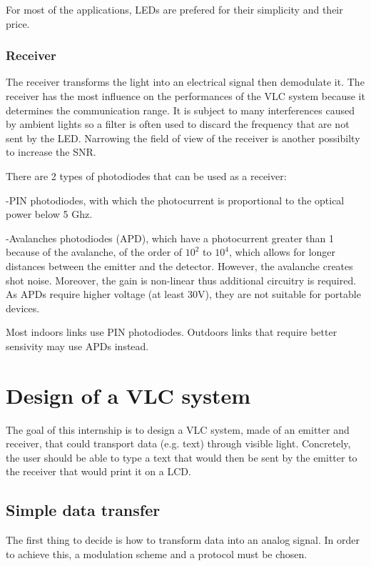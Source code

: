 \documentclass[12pt]{report}
\begin{document}
For most of the applications, LEDs are prefered for their simplicity and their price.

\subsection{Receiver}

The receiver transforms the light into an electrical signal then demodulate it. The receiver has the most influence on the performances of the VLC system because it determines the communication range. It is subject to many interferences caused by ambient lights so a filter is often used to discard the frequency that are not sent by the LED. Narrowing the field of view of the receiver is another possibilty to increase the SNR.

There are 2 types of photodiodes that can be used as a receiver:

-PIN photodiodes, with which the photocurrent is proportional to the optical power below 5 Ghz.

-Avalanches photodiodes (APD), which have a photocurrent greater than 1 because of the avalanche, of the order of $10^2$ to $10^4$, which allows for longer distances between the emitter and the detector. However, the avalanche creates shot noise. Moreover, the gain is non-linear thus additional circuitry is required. As APDs require higher voltage (at least 30V), they are not suitable for portable devices.

Most indoors links use PIN photodiodes. Outdoors links that require better sensivity may use APDs instead.



\chapter{Design of a VLC system}

The goal of this internship is to design a VLC system, made of an emitter and receiver, that could transport data (e.g. text) through visible light.
Concretely, the user should be able to type a text that would then be sent by the emitter to the receiver that would print it on a LCD.

\section{Simple data transfer}

The first thing to decide is how to transform data into an analog signal. In order to achieve this, a modulation scheme and a protocol must be chosen.
\end{document}
